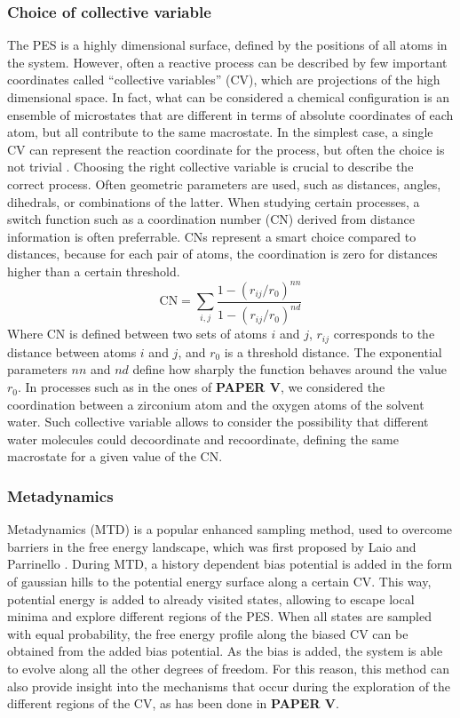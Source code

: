 \subsubsection{Choice of collective variable}
The PES is a highly dimensional surface, defined by the positions of all atoms in the system. However, often a reactive process can be described by few important coordinates called ``collective variables'' (CV), which are projections of the high dimensional space. In fact, what can be considered a chemical configuration is an ensemble of microstates that are different in terms of absolute coordinates of each atom, but all contribute to the same macrostate. In the simplest case, a single CV can represent the reaction coordinate for the process, but often the choice is not trivial \cite{rohrdanz2013discovering}. Choosing the right collective variable is crucial to describe the correct process. Often geometric parameters are used, such as distances, angles, dihedrals, or combinations of the latter. When studying certain processes, a switch function such as a coordination number (CN) derived from distance information is often preferrable. CNs represent a smart choice compared to distances, because for each pair of atoms, the coordination is zero for distances higher than a certain threshold.
\[
\mathrm{CN} =\sum_{i,j}\frac{1-(r_{ij}/r_0 )^{nn}}{1-(r_{ij}/r_0 )^{nd}}
\] 
Where CN is defined between two sets of atoms ${i}$ and ${j}$, $r_{ij}$ corresponds to the distance between atoms $i$ and $j$,  and $r_0$ is a threshold distance. The exponential parameters $nn$ and $nd$ define how sharply the function behaves around the value $r_0$. In processes such as in the ones of \textbf{PAPER V}, we considered the coordination between a zirconium atom and the oxygen atoms of the solvent water. Such collective variable allows to consider the possibility that different water molecules could decoordinate and recoordinate, defining the same macrostate for a given value of the CN. 

\subsubsection{Metadynamics}
Metadynamics (MTD) is a popular enhanced sampling method, used to overcome barriers in the free energy landscape, which was first proposed by Laio and Parrinello \cite{laio2002escaping, barducci2011metadynamics}. During MTD, a history dependent bias potential is added in the form of gaussian hills to the potential energy surface along a certain CV. This way, potential energy is added to already visited states, allowing to escape local minima and explore different regions of the PES. When all states are sampled with equal probability, the free energy profile along the biased CV can be obtained from the added bias potential. As the bias is added, the system is able to evolve along all the other degrees of freedom. For this reason, this method can also provide insight into the mechanisms that occur during the exploration of the different regions of the CV, as has been done in \textbf{PAPER V}. 

